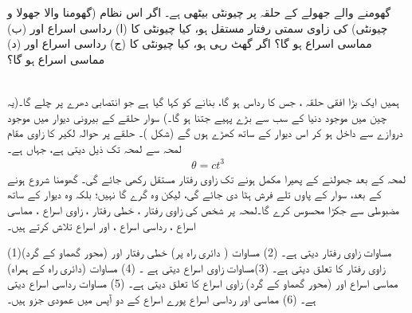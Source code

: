 گھومنے والے جھولے     کے حلقہ   پر چیونٹی بیٹھی ہے۔ اگر اس  نظام (گھومنا والا جھولا  و چیونٹی)  کی  زاوی سمتی رفتار  مستقل ہو، کیا چیونٹی کا (ا) رداسی اسراع اور (ب) مماسی اسراع ہو گا؟ اگر  گھٹ رہی ہو، کیا چیونٹی کا (ج) رداسی اسراع اور (د) مماسی اسراع ہو گا؟

\\
ہمیں ایک بڑا افقی   حلقہ ، جس کا رداس  ہو گا،  بنانے کو کہا گیا ہے جو انتصابی دھرے پر چلے گا۔(یہ چین میں  موجود دنیا کے سب سے بڑے پہیے جتنا ہو گا۔) سوار حلقے کے  بیرونی  دیوار میں موجود دروازے سے داخل ہو کر اس  دیوار کے ساتھ کھڑے ہوں گے (شکل )۔ حلقے پر حوالہ لکیر کا زاوی مقام   لمحہ  سے لمحہ     تک ذیل دیتی ہے، جہاں  ہے۔
\begin{align}
\theta=ct^3
\end{align}
لمحہ  کے بعد جھولنے  کے پھیرا  مکمل ہونے تک  زاوی رفتار مستقل  رکھی جائے گی۔ گھومنا شروع ہونے کے بعد، سوار کے پاوں تلے فرش ہٹا دی جائے گی، لیکن وہ گرے گا نہیں؛ بلکہ وہ دیوار کے ساتھ مضبوطی سے جکڑا  محسوس کرے گا۔لمحہ  پر شخص  کی زاوی رفتار ، خطی رفتار ، زاوی اسراع ، مماسی اسراع ،  رداسی اسراع ، اور   اسراع  تلاش کرتے ہیں۔

(1)مساوات     زاوی رفتار   دیتی ہے۔ (2) مساوات  (  دائری راہ پر) خطی رفتار   اور (محور گھماو کے گرد)   زاوی رفتار     کا تعلق  دیتی ہے۔ (3)مساوات     زاوی اسراع   دیتی ہے ۔ (4)  مساوات  (دائری راہ کے ہمراہ) مماسی اسراع  اور  (محور گھماو کے گرد) زاوی اسراع  کا تعلق   دیتی ہے۔ (5)  مساوات  رداسی اسراع  دیتی ہے۔  (6)  مماسی اور رداسی اسراع   پورے اسراع  کے دو آپس میں عمودی جزو ہیں۔

